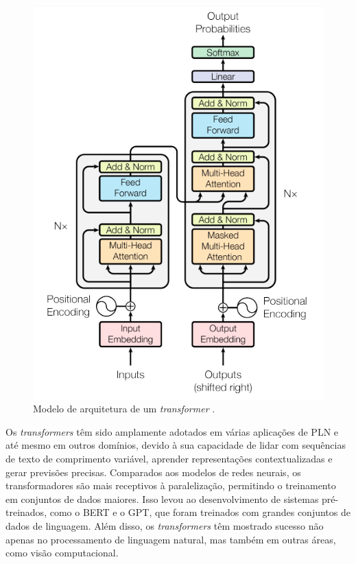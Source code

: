 \begin{figure}[!htbp]
	\centering
	\includegraphics[scale=0.6]{imagens/arch-transformers.png}
    \caption {Modelo de arquitetura de um \textit{transformer} \cite{GoogleTeamTransformers}.}
\end{figure}

Os \textit{transformers} têm sido amplamente adotados em várias aplicações de PLN e até mesmo em outros domínios, devido à sua capacidade de lidar com sequências de texto de comprimento variável, aprender representações contextualizadas e gerar previsões precisas. Comparados aos modelos de redes neurais, os transformadores são mais receptivos à paralelização, permitindo o treinamento em conjuntos de dados maiores. Isso levou ao desenvolvimento de sistemas pré-treinados, como o BERT e o GPT, que foram treinados com grandes conjuntos de dados de linguagem. Além disso, os \textit{transformers} têm mostrado sucesso não apenas no processamento de linguagem natural, mas também em outras áreas, como visão computacional.

